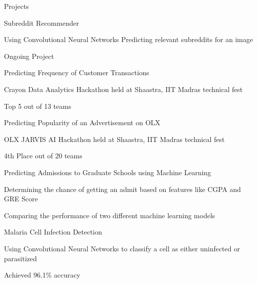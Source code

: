 \documentclass{resume} %
\begin{document}
\begin{rSection}{Projects}
	
	\begin{rSubsection}{Subreddit Recommender}{}{}{}
		\item Using Convolutional Neural Networks Predicting relevant subreddits for an image
		\item Ongoing Project
	\end{rSubsection}
	
	\begin{rSubsection}{Predicting Frequency of Customer Transactions}{}{}{}
		\item Crayon Data Analytics Hackathon held at Shaastra, IIT Madras technical fest
		\item Top 5 out of 13 teams
	\end{rSubsection}

	\begin{rSubsection}{Predicting Popularity of an Advertisement on OLX}{}{}{}
		\item OLX JARVIS AI Hackathon held at Shaastra, IIT Madras technical fest
		\item 4th Place out of 20 teams
	\end{rSubsection}
	
	\begin{rSubsection}{Predicting Admissions to Graduate Schools using Machine Learning}{}{}{}
		\item Determining the chance of getting an admit based on features like CGPA and GRE Score
		\item Comparing the performance of two different machine learning models
		
	\end{rSubsection}
	
	\begin{rSubsection}{Malaria Cell Infection Detection}{}{}{}
		\item Using Convolutional Neural Networks to classify a cell as either uninfected or parasitized
		\item Achieved 96.1\% accuracy
		
	\end{rSubsection}
	
\end{rSection}



\end{document}
